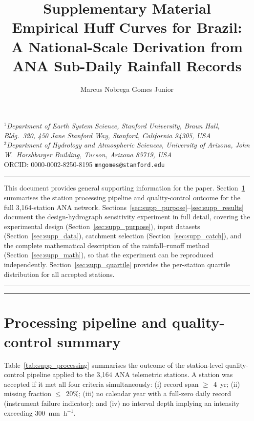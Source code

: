 \documentclass[11pt]{article}
\title{\textbf{Supplementary Material}\\[6pt]
{\large Empirical Huff Curves for Brazil: A National-Scale Derivation
from ANA Sub-Daily Rainfall Records}}
\author{Marcus Nobrega Gomes Junior}
\date{}
\begin{document}
\maketitle

\begin{center}\small
  \textit{$^1$Department of Earth System Science, Stanford University,
  Braun Hall, Bldg.\ 320, 450 Jane Stanford Way,
  Stanford, California 94305, USA}\\[3pt]
  \textit{$^2$Department of Hydrology and Atmospheric Sciences,
  University of Arizona,
  John W.\ Harshbarger Building, Tucson, Arizona 85719, USA}\\[5pt]
  ORCID: 0000-0002-8250-8195\quad
  \texttt{mngomes@stanford.edu}
\end{center}
\vspace{0.5em}
\noindent\rule{\linewidth}{0.4pt}
\vspace{0.5em}

This document provides general supporting information for the paper.
Section~\ref{sec:supp_pipeline} summarises the station processing
pipeline and quality-control outcome for the full 3{,}164-station
ANA network.
Sections~\ref{sec:supp_purpose}--\ref{sec:supp_results} document the
design-hydrograph sensitivity experiment in full detail, covering
the experimental design (Section~\ref{sec:supp_purpose}), input
datasets (Section~\ref{sec:supp_data}), catchment selection
(Section~\ref{sec:supp_catch}), and the complete mathematical
description of the rainfall--runoff method
(Section~\ref{sec:supp_math}), so that the experiment can be
reproduced independently.
Section~\ref{sec:supp_quartile} provides the per-station quartile
distribution for all accepted stations.

\vspace{1em}
\noindent\rule{\linewidth}{0.4pt}
{\setlength{\parskip}{0pt}
\listoftables
\listoffigures}
\noindent\rule{\linewidth}{0.4pt}
\vspace{0.5em}

\section{Processing pipeline and quality-control summary}
\label{sec:supp_pipeline}

Table~\ref{tab:supp_processing} summarises the outcome of the
station-level quality-control pipeline applied to the 3{,}164 ANA
telemetric stations. A station was accepted if it met all four
criteria simultaneously: (i) record span $\geq$~4~yr; (ii) missing
fraction $\leq$~20\%; (iii) no calendar year with a full-zero daily
record (instrument failure indicator); and (iv) no interval depth
implying an intensity exceeding 300~mm~h$^{-1}$.
\end{document}
